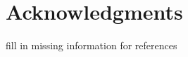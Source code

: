 \documentclass[10pt,letterpaper]{article}
\newcommand{\todo}[1]{{\color{red}#1}}
\begin{document}





\section{Acknowledgments}



\todo{fill in missing information for references}

\setlength{\bibleftmargin}{.125in}
\setlength{\bibindent}{-\bibleftmargin}


\end{document}
